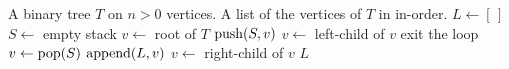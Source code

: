 
\begin{algorithmic}[1]
\Require A binary tree $T$ on $n > 0$ vertices.
\Ensure A list of the vertices of $T$ in in-order.
\State $L \gets [\,]$
\State $S \gets$ empty stack
\State $v \gets$ root of $T$
\While{$\MyTrue$}
    \State $\operatorname*{push}(S, v)$
    \State $v \gets$ left-child of $v$
  \Else
      \State exit the loop
    \EndIf
    \State $v \gets \operatorname*{pop}(S)$
    \State $\operatorname*{append}(L, v)$
    \State $v \gets$ right-child of $v$
  \EndIf
\EndWhile
\State \Return $L$
\end{algorithmic}
